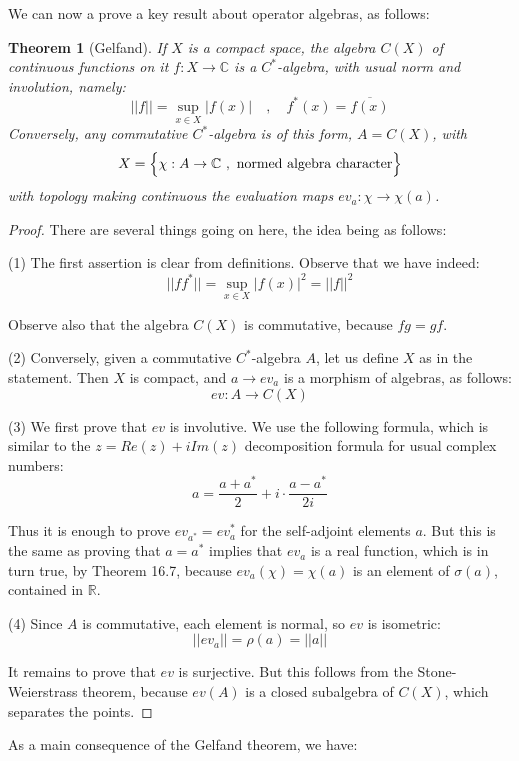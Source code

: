 \documentclass[12pt]{amsbook}
\newtheorem{theorem}{Theorem}[chapter]
\begin{document}
We can now a prove a key result about operator algebras, as follows:

\begin{theorem}[Gelfand]
If $X$ is a compact space,  the algebra $C(X)$ of continuous functions on it $f:X\to\mathbb C$ is a $C^*$-algebra, with usual norm and involution, namely:
$$||f||=\sup_{x\in X}|f(x)|\quad,\quad 
f^*(x)=\overline{f(x)}$$
Conversely, any commutative $C^*$-algebra is of this form, $A=C(X)$, with 
$$X=\Big\{\chi:A\to\mathbb C\ ,\ {\rm normed\ algebra\ character}\Big\}$$
with topology making continuous the evaluation maps $ev_a:\chi\to\chi(a)$.
\end{theorem}

\begin{proof}
There are several things going on here, the idea being as follows:

\medskip

(1) The first assertion is clear from definitions. Observe that we have indeed:
$$||ff^*||
=\sup_{x\in X}|f(x)|^2
=||f||^2$$

Observe also that the algebra $C(X)$ is commutative, because $fg=gf$.

\medskip

(2) Conversely, given a commutative $C^*$-algebra $A$, let us define $X$ as in the statement. Then $X$ is compact, and $a\to ev_a$ is a morphism of algebras, as follows:
$$ev:A\to C(X)$$

(3) We first prove that $ev$ is involutive. We use the following formula, which is similar to the $z=Re(z)+iIm(z)$ decomposition formula for usual complex numbers:
$$a=\frac{a+a^*}{2}+i\cdot\frac{a-a^*}{2i}$$

Thus it is enough to prove $ev_{a^*}=ev_a^*$ for the self-adjoint elements $a$. But this is the same as proving that $a=a^*$ implies that $ev_a$ is a real function, which is in turn true, by Theorem 16.7, because $ev_a(\chi)=\chi(a)$ is an element of $\sigma(a)$, contained in $\mathbb R$.

\medskip

(4) Since $A$ is commutative, each element is normal, so $ev$ is isometric:
$$||ev_a||
=\rho(a)
=||a||$$

It remains to prove that $ev$ is surjective. But this follows from the Stone-Weierstrass theorem, because $ev(A)$ is a closed subalgebra of $C(X)$, which separates the points.
\end{proof}

As a main consequence of the Gelfand theorem, we have:
\end{document}

